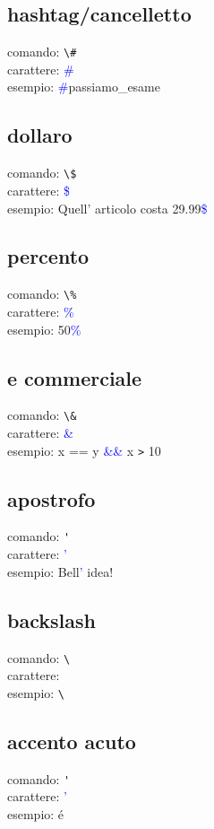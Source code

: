 \documentclass{article}
\begin{document}
        \subsection{hashtag/cancelletto}
            comando: \verb!\#! \\
            carattere: \textcolor{blue}{\#} \\
            esempio: \textcolor{blue}{\#}passiamo\_esame
        \subsection{dollaro}
            comando: \verb!\$! \\
            carattere: \textcolor{blue}{\$} \\
            esempio: Quell' articolo costa 29.99\textcolor{blue}{\$} 
        \subsection{percento}
            comando: \verb!\%! \\
            carattere: \textcolor{blue}{\%} \\
            esempio: 50\textcolor{blue}{\%}
        \subsection{e commerciale}
            comando: \verb!\&! \\
            carattere: \textcolor{blue}{\&} \\
            esempio: x == y \textcolor{blue}{\&\&} x \verb!>! 10
        \subsection{apostrofo}
            comando: \verb!'! \\
            carattere: \textcolor{blue}{'} \\
            esempio: Bell\textcolor{blue}{'} idea!
        \subsection{backslash}
            comando: \verb!\! \\
            carattere: \textcolor{blue}{} \\
            esempio: \verb!\!
        \subsection{accento acuto} 
            comando: \verb!'! \\
            carattere: \textcolor{blue}{'} \\
            esempio: \'{e}
\end{document}
